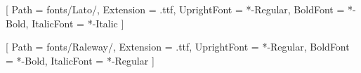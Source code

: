 \usepackage{fontspec}

\setmainfont{Lato}[
    Path = fonts/Lato/,
    Extension = .ttf,
    UprightFont = *-Regular,
    BoldFont = *-Bold,
    ItalicFont = *-Italic
]

\setsansfont{Raleway}[
    Path = fonts/Raleway/,
    Extension = .ttf,
    UprightFont = *-Regular,
    BoldFont = *-Bold,
    ItalicFont = *-Regular %
]

\newcommand{\heading}[1]{{\Large\sffamily\bfseries #1}}
\newcommand{\subheading}[1]{{\large\sffamily #1}}
\newcommand{\lighttext}[1]{{\sffamily #1}}